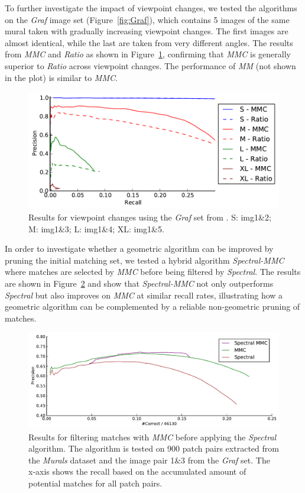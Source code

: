 To further investigate the impact of viewpoint changes, we tested the 
algorithms on the \emph{Graf} image set (Figure~\ref{fig:Graf}), which 
contains 5 images of the same mural taken with gradually increasing 
viewpoint changes.  The first images are almost identical, while the 
last are taken from very different angles. The results from   \emph{MMC} 
and \emph{Ratio} as shown in Figure~\ref{fig:result_viewpoint}, 
confirming that \emph{MMC} is generally superior to \emph{Ratio} across 
viewpoint changes.
The performance of \emph{MM} (not shown in the plot) is similar to 
\emph{MMC}.

\begin{figure}[htb]
	\centering
	\includegraphics[width=1\textwidth]{images/result_viewpoint}
	\caption{Results for viewpoint changes using the \emph{Graf} set 
	from \cite{mikolajczyk2005performance}.  S: img1\&2; M: img1\&3; L: 
	img1\&4; XL: img1\&5.}
	\label{fig:result_viewpoint}
\end{figure}

In order to investigate whether a geometric algorithm can be improved by
pruning the initial matching set, we tested a hybrid algorithm 
\emph{Spectral-MMC} where matches are selected by \emph{MMC} before 
being filtered by \emph{Spectral}. The results are shown in 
Figure~\ref{fig:result_spectral-mmc} and show that \emph{Spectral-MMC} 
not only outperforms \emph{Spectral} but also improves on \emph{MMC} at 
similar recall rates, illustrating how a geometric algorithm can be 
complemented by a reliable non-geometric pruning of matches.

\begin{figure}[htb]
	\centering
	\includegraphics[width=1\textwidth]{images/result_spectral-mmc}
	\caption{Results for filtering matches with \emph{MMC} before 
	applying the \emph{Spectral} algorithm. The algorithm is tested on 
900 patch pairs extracted from the \emph{Murals} dataset and the image 
pair 1\&3 from the \emph{Graf} set. The x-axis shows the recall based on 
the accumulated amount of potential matches for all patch pairs.}
	\label{fig:result_spectral-mmc}
\end{figure}

